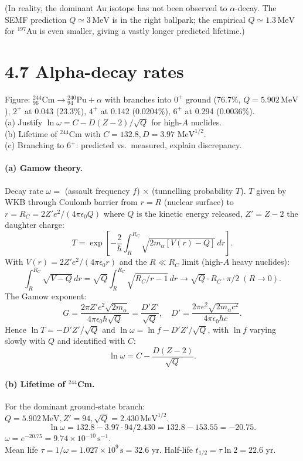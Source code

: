 \documentclass[11pt]{article}
\newcommand{\Q}[1]{\begin{question}#1\end{question}}
\newcommand{\MeV}{\,\mathrm{MeV}}
\begin{document}
(In reality, the dominant Au isotope has not been observed to $\alpha$-decay. The SEMF prediction $Q\simeq 3\MeV$ is in the right ballpark; the empirical $Q\simeq 1.3\MeV$ for $^{197}$Au is even smaller, giving a vastly longer predicted lifetime.)

\section*{4.7 \quad Alpha-decay rates}

\Q{Figure: $^{244}_{96}\mathrm{Cm}\to{}^{240}_{94}\mathrm{Pu}+\alpha$ with branches into $0^+$ ground (76.7\%, $Q=5.902\MeV$), $2^+$ at 0.043 (23.3\%), $4^+$ at 0.142 (0.0204\%), $6^+$ at 0.294 (0.0036\%).\\
(a) Justify $\ln\omega=C-D(Z-2)/\sqrt{Q}$ for high-$A$ nuclides.\\
(b) Lifetime of $^{244}$Cm with $C=132.8,D=3.97\,\MeV^{1/2}$.\\
(c) Branching to $6^+$: predicted vs.\ measured, explain discrepancy.}

\paragraph{(a) Gamow theory.} Decay rate $\omega=$ (assault frequency $f$) $\times$ (tunnelling probability $T$). $T$ given by WKB through Coulomb barrier from $r=R$ (nuclear surface) to $r=R_C=2 Z' e^{2}/(4\pi\epsilon_{0}Q)$ where $Q$ is the kinetic energy released, $Z'=Z-2$ the daughter charge:
\[
T=\exp\!\left[-\frac{2}{\hbar}\int_R^{R_C}\!\sqrt{2m_\alpha[V(r)-Q]}\,dr\right].
\]
With $V(r)=2 Z' e^{2}/(4\pi\epsilon_{0}r)$ and the $R\ll R_C$ limit (high-$A$ heavy nuclides):
\[
\int_R^{R_C}\!\sqrt{V-Q}\,dr=\sqrt{Q}\!\int_R^{R_C}\!\sqrt{R_C/r-1}\,dr\to\sqrt{Q}\cdot R_C\cdot\pi/2\;(R\to 0).
\]
The Gamow exponent:
\[
G=\frac{2\pi Z' e^{2}\sqrt{2 m_\alpha}}{4\pi\epsilon_{0}\hbar\sqrt{Q}}=\frac{D' Z'}{\sqrt{Q}},\quad D'=\frac{2\pi e^{2}\sqrt{2 m_\alpha c^{2}}}{4\pi\epsilon_{0}\hbar c}.
\]
Hence $\ln T=-D' Z'/\sqrt{Q}$ and $\ln\omega=\ln f-D' Z'/\sqrt{Q}$, with $\ln f$ varying slowly with $Q$ and identified with $C$:
\[
\boxed{\;\ln\omega=C-\frac{D(Z-2)}{\sqrt{Q}}.\;}
\]

\paragraph{(b) Lifetime of $^{244}$Cm.} For the dominant ground-state branch: $Q=5.902\MeV,Z'=94,\sqrt{Q}=2.430\MeV^{1/2}$.
\[
\ln\omega=132.8-3.97\cdot 94/2.430=132.8-153.55=-20.75.
\]
$\omega=e^{-20.75}=9.74\times 10^{-10}\,\mathrm{s^{-1}}$.\\
Mean life $\tau=1/\omega=1.027\times 10^{9}\,\mathrm{s}=32.6$ yr. Half-life $t_{1/2}=\tau\ln 2=22.6$ yr.
\end{document}
